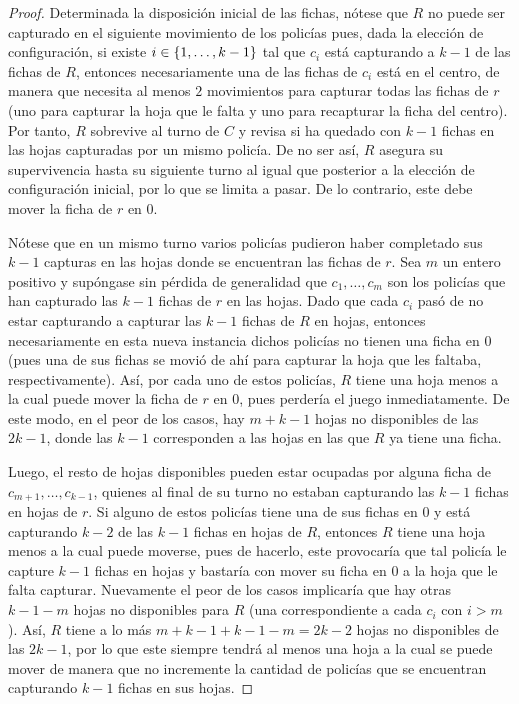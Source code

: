\begin{proof}
    Determinada la disposici\'on inicial de las fichas, n\'otese que $R$ no
    puede ser capturado en el siguiente movimiento de los polic\'ias pues, dada
    la elecci\'on de configuraci\'on, si existe $i\in\{1,\dots, k-1\}$ tal que $c_i$
    est\'a capturando a $k-1$ de las fichas de $R$, entonces necesariamente una
    de las fichas de $c_i$ est\'a en el centro, de manera que necesita al menos
    $2$ movimientos para capturar todas las fichas de $r$ (uno para capturar la
    hoja que le falta y uno para recapturar la ficha del centro). Por tanto, $R$
    sobrevive al turno de $C$ y revisa si ha quedado con $k-1$ fichas en las
    hojas capturadas por un mismo polic\'ia. De no ser as\'i, $R$ asegura su
    supervivencia hasta su siguiente turno al igual que posterior a la
    elecci\'on de configuraci\'on inicial, por lo que se limita a pasar. De lo
    contrario, este debe mover la ficha de $r$ en $0$.
    
    N\'otese que en un mismo turno varios polic\'ias pudieron haber completado
    sus $k-1$ capturas en las hojas donde se encuentran las fichas de $r$. Sea
    $m$ un entero positivo y sup\'ongase sin p\'erdida de generalidad que
    $c_{1},\dots, c_{m}$ son los polic\'ias que han capturado las $k-1$ fichas
    de $r$ en las hojas. Dado que cada $c_{i}$ pas\'o de no estar capturando a
    capturar las $k-1$ fichas de $R$ en hojas, entonces necesariamente en esta
    nueva instancia dichos polic\'ias no tienen una ficha en $0$ (pues una de
    sus fichas se movi\'o de ah\'i para capturar la hoja que les faltaba,
    respectivamente). As\'i, por cada uno de estos polic\'ias, $R$ tiene una
    hoja menos a la cual puede mover la ficha de $r$ en $0$, pues perder\'ia el
    juego inmediatamente. De este modo, en el peor de los casos, hay $m+k-1$
    hojas no disponibles de las $2k-1$, donde las $k-1$ corresponden a las hojas
    en las que $R$ ya tiene una ficha.

    Luego, el resto de hojas disponibles pueden estar ocupadas por alguna ficha
    de  $c_{{m+1}},\dots,c_{{k-1}}$, quienes al final de su turno no estaban
    capturando las $k-1$ fichas en hojas de $r$. Si alguno de estos polic\'ias
    tiene una de sus fichas en $0$ y est\'a capturando $k-2$ de las $k-1$ fichas
    en hojas de $R$, entonces $R$ tiene una hoja menos a la cual puede moverse,
    pues de hacerlo, este provocar\'ia que tal polic\'ia le capture $k-1$ fichas
    en hojas y bastar\'ia con mover su ficha en $0$ a la hoja que le falta
    capturar. Nuevamente el peor de los casos implicar\'ia que hay otras $k-1-m$
    hojas no disponibles para $R$ (una correspondiente a cada $c_i$ con $i>m$).
    As\'i, $R$ tiene a lo m\'as $m+k-1+k-1-m=2k-2$ hojas no disponibles de las
    $2k-1$, por lo que este siempre tendr\'a al menos una hoja a la cual se
    puede mover de manera que no incremente la cantidad de polic\'ias que se
    encuentran capturando $k-1$ fichas en sus hojas.


\end{proof}
